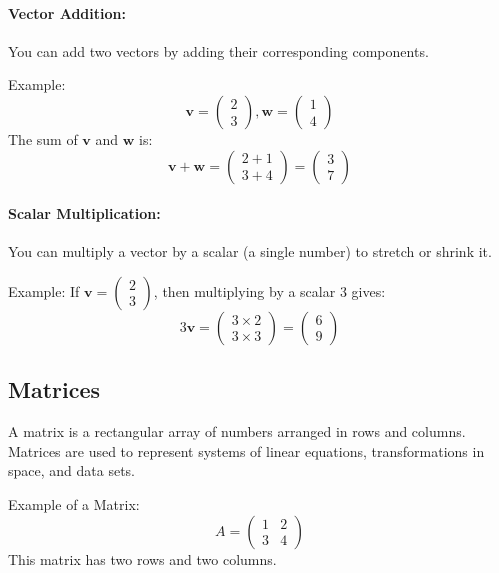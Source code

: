 \paragraph{Vector Addition:} You can add two vectors by adding their corresponding components.

Example:
\[
\mathbf{v} = \begin{pmatrix} 2 \\ 3 \end{pmatrix}, \mathbf{w} = \begin{pmatrix} 1 \\ 4 \end{pmatrix}
\]
The sum of \(\mathbf{v}\) and \(\mathbf{w}\) is:
\[
\mathbf{v} + \mathbf{w} = \begin{pmatrix} 2 + 1 \\ 3 + 4 \end{pmatrix} = \begin{pmatrix} 3 \\ 7 \end{pmatrix}
\]

\paragraph{Scalar Multiplication:} You can multiply a vector by a scalar (a single number) to stretch or shrink it.

Example: If \(\mathbf{v} = \begin{pmatrix} 2 \\ 3 \end{pmatrix}\), then multiplying by a scalar 3 gives:
\[
3\mathbf{v} = \begin{pmatrix} 3 \times 2 \\ 3 \times 3 \end{pmatrix} = \begin{pmatrix} 6 \\ 9 \end{pmatrix}
\]

\subsection{Matrices}
A matrix is a rectangular array of numbers arranged in rows and columns. Matrices are used to represent systems of linear equations, transformations in space, and data sets.

Example of a Matrix:
\[
A = \begin{pmatrix} 1 & 2 \\ 3 & 4 \end{pmatrix}
\]
This matrix has two rows and two columns.

